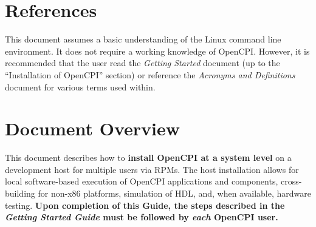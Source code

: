 \section{References}
This document assumes a basic understanding of the Linux command line environment. It does not require a working knowledge of OpenCPI. However, it is recommended that the user read the \textit{Getting Started} document (up to the ``Installation of OpenCPI'' section) or reference the \textit{Acronyms and Definitions} document for various terms used within.
\def\refskipig{} %
\def\myreferences{
\hline
Installation Guide\footnote{The RPM installation process is quite different from the process explained in the OpenCPI Installation Guide, but the OpenCPI Installation guide has applicable post-installation information for PCI-based boards, etc.}
& OpenCPI & \url{https://opencpi.github.io/OpenCPI_Installation.pdf} \\
\hline
Component Development Guide & OpenCPI & \url{https://opencpi.github.io/OpenCPI_Component_Development.pdf} \\
\hline
RCC Development Guide & OpenCPI & \url{https://opencpi.github.io/OpenCPI_RCC_Development.pdf} \\
\hline
HDL Development Guide & OpenCPI & \url{https://opencpi.github.io/OpenCPI_HDL_Development.pdf} \\
\hline
FPGA Vendor Tools Installation Guide & ANGRYVIPER & \url{https://opencpi.github.io/FPGA_Vendor_Tools_Installation_Guide.pdf} \\
\hline
Managing Software with \texttt{yum} & CentOS Project &  \url{https://www.centos.org/docs/5/html/yum/} \\
\hline
CentOS Deployment Guide: Useful \texttt{yum} commands (\textit{e.g.} \texttt{yum localinstall}) & CentOS Project &  \url{https://www.centos.org/docs/5/html/5.2/Deployment_Guide/s1-yum-useful-commands.html} \\
}

\newpage
\section{Document Overview}
\label{sec:doc_overview}
This document describes how to \textbf{install OpenCPI at a system level} on a development host for multiple users via RPMs. The host installation allows for local software-based execution of OpenCPI applications and components, cross-building for non-x86 platforms, simulation of HDL, and, when available, hardware testing. \textbf{Upon completion of this Guide, the steps described in the \textit{Getting Started Guide} must be followed by \textit{each} OpenCPI user.}\\

